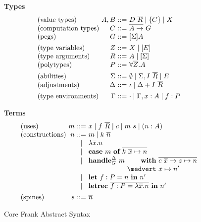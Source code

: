 \documentclass[11pt]{article}
\makeatletter
\newcommand{\fighead}{\textbf}
\newcommand{\many}{\overline}
\newcommand\ba{\begin{array}}
\newcommand\ea{\end{array}}
\newenvironment{syntax}{\[\ba{@{}l@{~}r@{~}c@{~}l@{}}}{\ea\]\ignorespacesafterend}
\newcommand{\sig}{I}
\newcommand{\sigs}{\Sigma}
\newcommand{\effbox}[1]{[#1]}
\newcommand{\key}[1]{\textbf{#1}} %
\newcommand{\handleSymbol}{\rightarrow}
\newcommand{\handle}[2]{{#1} \handleSymbol {#2}}
\newcommand{\thunk}[1]{\{{#1}\}}
\newcommand\slab[1]{(\textrm{#1})}
\newcommand{\adj}{\Delta}
\newcommand{\ev}{E}
\newcommand{\nowt}{\emptyset}
\newcommand{\id}{\iota}
\makeatother
\begin{document}
\begin{figure}
\fighead{Types}
\begin{syntax}
\slab{value types}       &A, B     &::=& D~\many{R} \mid \thunk{C} \mid X \\
\slab{computation types} &C        &::=& \many{A \to}~G \\
\slab{pegs}              &G             &::=& \effbox{\sigs}A \\
[1ex]
\slab{type variables}    &Z        &::=& X \mid \effbox{\ev} \\
\slab{type arguments}    &R        &::=& A \mid \effbox{\sigs} \\
\slab{polytypes}         &P        &::=& \forall \many{Z}.A \\
[1ex]
\slab{abilities}    &\sigs  &::=&
  \nowt \mid \sigs, \sig~\many{R} \mid \ev \\
\slab{adjustments}  &\adj  &::=&
  \id \mid \adj + \sig~\many{R} \\
[1ex]
\slab{type environments}
                    &\Gamma        &::=& \cdot \mid \Gamma, x:A \mid f:P \\
\end{syntax}

\fighead{Terms}
\begin{syntax}
\slab{uses}         &m       &::=& x \mid f~\many{R} \mid c \mid m~s \mid (n : A) \\
\slab{constructions}&n       &::=& m \mid k~\many{n} \\
   &&\mid& \lambda \many{x}.n \\
   &&\mid& \key{case}~m~\key{of}~
             \many{k~\many{x} \mapsto n} \\
   &&\mid& \key{handle}^\adj_G~m~
             \ba[t]{@{}r@{}l@{}}
             \key{with}~& \many{\handle{c~\many{x}}{z} \mapsto n} \\
             \medvert~  &  x \mapsto n' \\
             \ea \\
   &&\mid&  \key{let}~f : P = n~\key{in}~n' \\
   &&\mid&  \key{letrec}~\many{f : P = \lambda \many{x}.n}~\key{in}~n' \\
[1ex]
\slab{spines}&s           &::=& \many{n} \\
\end{syntax}
\caption{Core Frank Abstract Syntax}
\label{fig:core-syntax}
\end{figure}
\end{document}
